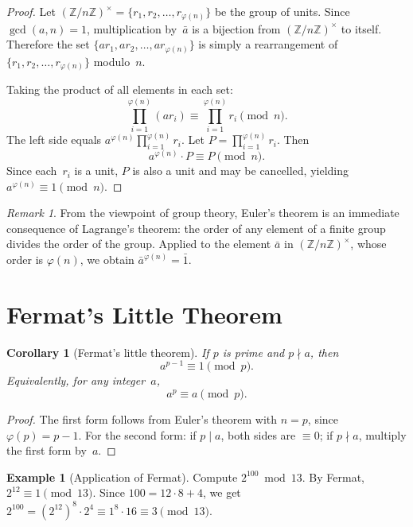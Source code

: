 \documentclass[12pt,a4paper,openany]{book}
\theoremstyle{definition}
\newtheorem{example}[definition]{Example}
\theoremstyle{plain}
\newtheorem{corollary}[definition]{Corollary}
\theoremstyle{remark}
\newtheorem{remark}[definition]{Remark}
\newcommand{\Z}{\mathbb{Z}}
\begin{document}
\begin{proof}
\label{proof:euler}
Let $(\Z/n\Z)^\times = \{r_1, r_2, \dots, r_{\varphi(n)}\}$ be the group of
units.  Since $\gcd(a,n) = 1$, multiplication by~$\bar{a}$ is a
bijection from $(\Z/n\Z)^\times$ to itself.
Therefore the set $\{ar_1, ar_2, \dots, ar_{\varphi(n)}\}$ is simply a
rearrangement of $\{r_1, r_2, \dots, r_{\varphi(n)}\}$ modulo~$n$.

Taking the product of all elements in each set:
\[
  \prod_{i=1}^{\varphi(n)} (ar_i) \equiv \prod_{i=1}^{\varphi(n)} r_i \pmod{n}.
\]
The left side equals $a^{\varphi(n)} \prod_{i=1}^{\varphi(n)} r_i$.  Let
$P = \prod_{i=1}^{\varphi(n)} r_i$.  Then
\[
  a^{\varphi(n)} \cdot P \equiv P \pmod{n}.
\]
Since each~$r_i$ is a unit, $P$ is also a unit and may be cancelled,
yielding $a^{\varphi(n)} \equiv 1 \pmod{n}$.
\end{proof}

\begin{remark}
\label{rem:euler-group-theory}
From the viewpoint of group theory, Euler's theorem is an immediate consequence
of Lagrange's theorem: the order of any element
of a finite group divides the order of the group.  Applied to the element
$\bar{a}$ in $(\Z/n\Z)^\times$, whose order is $\varphi(n)$, we obtain
$\bar{a}^{\varphi(n)} = \bar{1}$.
\end{remark}

\section{Fermat's Little Theorem}
\label{sec:fermat-little}

\begin{corollary}[Fermat's little theorem]
\label{cor:fermat-little}
If $p$ is prime and $p \nmid a$, then
\[
  a^{p-1} \equiv 1 \pmod{p}.
\]
Equivalently, for any integer~$a$,
\[
  a^p \equiv a \pmod{p}.
\]
\end{corollary}

\begin{proof}
The first form follows from Euler's theorem with $n = p$, since
$\varphi(p) = p-1$.  For the second form: if $p \mid a$, both sides are
$\equiv 0$; if $p \nmid a$, multiply the first form by~$a$.
\end{proof}

\begin{example}[Application of Fermat]
\label{ex:fermat-app}
Compute $2^{100} \bmod 13$.  By Fermat, $2^{12} \equiv 1 \pmod{13}$.
Since $100 = 12 \cdot 8 + 4$, we get
$2^{100} = (2^{12})^8 \cdot 2^4 \equiv 1^8 \cdot 16 \equiv 3 \pmod{13}$.
\end{example}
\end{document}
